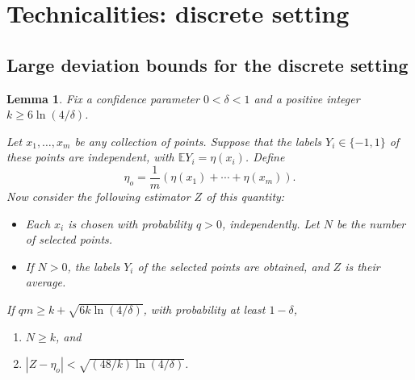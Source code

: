 \documentclass{article}
\def\E{{\mathbb E}}
\newtheorem{lemma}[thm]{Lemma}
\begin{document}



\pagebreak
\appendix

\section{Technicalities: discrete setting}

\subsection{Large deviation bounds for the discrete setting}

\begin{lemma}
Fix a confidence parameter $0 < \delta < 1$ and a positive integer $k \geq 6 \ln (4/\delta)$. 

Let $x_1, \ldots, x_m$ be any collection of points. Suppose that the labels $Y_i \in \{-1,1\}$ of these points are independent, with $\E Y_i = \eta(x_i)$. Define
$$ \eta_o = \frac{1}{m} \left( \eta(x_1) + \cdots + \eta(x_m) \right) .$$
Now consider the following estimator $Z$ of this quantity:
\begin{itemize}
\item Each $x_i$ is chosen with probability $q > 0$, independently. Let $N$ be the number of selected points.
\item If $N > 0$, the labels $Y_i$ of the selected points are obtained, and $Z$ is their average.
\end{itemize}
If $qm \geq k + \sqrt{6k \ln (4/\delta)}$, with probability at least $1-\delta$, 
\begin{enumerate}
\item[(a)] $N \geq k$, and 
\item[(b)] $| Z - \eta_o| < \sqrt{(48/k) \ln (4/\delta)}$.
\end{enumerate}
\label{lemma:large-deviation-discrete}
\end{lemma}
\end{document}
